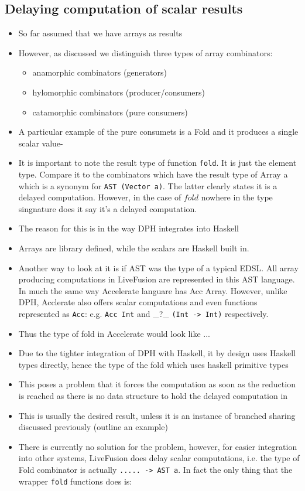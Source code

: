 \documentclass[preamble.tex]{subfiles}
\begin{document}
\subsection{Delaying computation of scalar results}
\begin{itemize}
\item So far assumed that we have arrays as results
\item However, as discussed we distinguish three types of array combinators:
\begin{itemize}
  \item anamorphic combinators (generators)
  \item hylomorphic combinators (producer/consumers)
  \item catamorphic combinators (pure consumers)
\end{itemize}
\item A particular example of the pure consumets is a Fold and it produces a single scalar value- 
\item It is important to note the result type of function \texttt{fold}. It is just the element type. Compare it to the combinators which have the result type of Array a which is a synonym for \texttt{AST (Vector a)}. The latter clearly states it is a delayed computation. However, in the case of $fold$ nowhere in the type singnature does it say it's a delayed computation.
\item The reason for this is in the way DPH integrates into Haskell
\item Arrays are library defined, while the scalars are Haskell built in.
\item Another way to look at it is if AST was the type of a typical EDSL. All array producing computations in LiveFusion are represented in this AST language. In much the same way Accelerate languare has Acc Array. However, unlike DPH, Acclerate also offers scalar computations and even functions represented as \texttt{Acc}: e.g. \texttt{Acc Int} and \_?\_ \texttt{(Int -> Int)} respectively.
\item Thus the type of fold in Accelerate would look like ...
\item Due to the tighter integration of DPH with Haskell, it by design uses Haskell types directly, hence the type of the fold which uses haskell primitive types
\item This poses a problem that it forces the computation as soon as the reduction is reached as there is no data structure to hold the delayed computation in
\item This is usually the desired result, unless it is an instance of branched sharing discussed previously (outline an example)
\item There is currently no solution for the problem, however, for easier integration into other systems, LiveFusion does delay scalar computations, i.e. the type of Fold combinator is actually \texttt{..... -> AST a}. In fact the only thing that the wrapper \texttt{fold} functions does is: 
\end{itemize}
\end{document}

